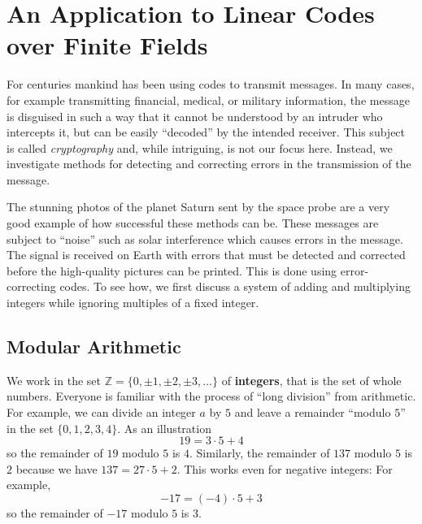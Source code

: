 \section{An Application to Linear Codes over Finite Fields}
\label{sec:8_7}

For centuries mankind has been using codes to transmit messages. In many cases, for example transmitting financial, medical, or military information, the message is disguised in such a way that it cannot be understood by an intruder who intercepts it, but can be easily ``decoded'' by the intended receiver. This subject is called \textit{cryptography} and, while intriguing, is not our focus here. Instead, we investigate methods for detecting and correcting errors in the transmission of the message.

The stunning photos of the planet Saturn sent by the space probe are a very good example of how successful these methods can be. These messages are subject to ``noise'' such as solar interference which causes errors in the message. The signal is received on Earth with errors that must be detected and corrected before the high-quality pictures can be printed. This is done using error-correcting codes. To see how, we first discuss a system of adding and multiplying integers while ignoring multiples of a fixed integer.

\subsection*{Modular Arithmetic}

We work in the set $\mathbb{Z} = \{ 0, \pm 1, \pm 2, \pm 3, \dots \}$ of \textbf{integers}, that is the set of whole numbers. Everyone is familiar with the process of ``long division'' from arithmetic. For example, we can divide an integer $a$ by $5$ and leave a remainder ``modulo $5$'' in the set $\{0, 1, 2, 3, 4\}$. As an illustration
\begin{equation*}
19 = 3 \cdot 5 + 4 
\end{equation*}
so the remainder of $19$ modulo $5$ is $4$. Similarly, the remainder of $137$ modulo $5$ is $2$ because we have $137 = 27 \cdot 5 + 2$. This works even for negative integers: For example,
\begin{equation*}
-17 = (-4) \cdot 5 + 3
\end{equation*}
so the remainder of $-17$ modulo $5$ is $3$.


